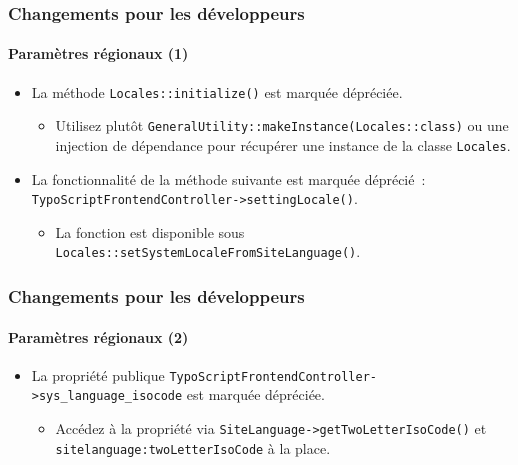 \begin{frame}[fragile]
	\frametitle{Changements pour les développeurs}
	\framesubtitle{Paramètres régionaux (1)}

	\begin{itemize}
		\item La méthode \texttt{Locales::initialize()} est marquée dépréciée.

			\begin{itemize}\smaller
				\item[\ding{228}] Utilisez plutôt \texttt{GeneralUtility::makeInstance(Locales::class)} ou une
				injection de dépendance pour récupérer une instance de la classe \texttt{Locales}.
			\end{itemize}\normalsize

		\item La fonctionnalité de la méthode suivante est marquée déprécié~:\newline
			\texttt{TypoScriptFrontendController->settingLocale()}.

			\begin{itemize}\smaller
				\item[\ding{228}] La fonction est disponible sous
				{\fontsize{8}{8}\selectfont\texttt{Locales::setSystemLocaleFromSiteLanguage()}.}
			\end{itemize}\normalsize

	\end{itemize}

\end{frame}


\begin{frame}[fragile]
	\frametitle{Changements pour les développeurs}
	\framesubtitle{Paramètres régionaux (2)}

	\begin{itemize}
		\item La propriété publique \texttt{TypoScriptFrontendController->sys\_language\_isocode}
			est marquée dépréciée.

			\begin{itemize}\smaller
				\item[\ding{228}] Accédez à la propriété via \texttt{SiteLanguage->getTwoLetterIsoCode()}
				et \texttt{sitelanguage:twoLetterIsoCode} à la place.
			\end{itemize}\normalsize

	\end{itemize}

\end{frame}

